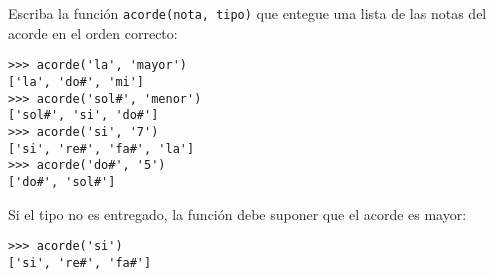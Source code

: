 Escriba la función \lstinline!acorde(nota, tipo)! que entegue una lista
de las notas del acorde en el orden correcto:

\begin{lstlisting}
>>> acorde('la', 'mayor')
['la', 'do#', 'mi']
>>> acorde('sol#', 'menor')
['sol#', 'si', 'do#']
>>> acorde('si', '7')
['si', 're#', 'fa#', 'la']
>>> acorde('do#', '5')
['do#', 'sol#']
\end{lstlisting}

Si el tipo no es entregado, la función debe suponer que el acorde es
mayor:

\begin{lstlisting}
>>> acorde('si')
['si', 're#', 'fa#']
\end{lstlisting}

